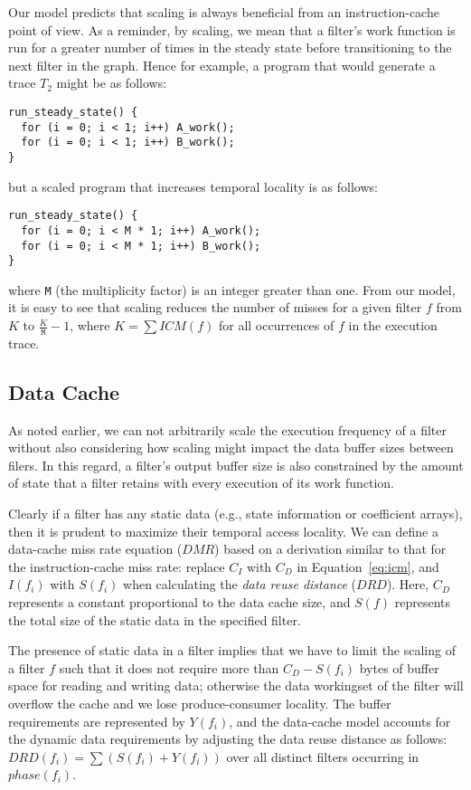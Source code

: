 Our model predicts that scaling is always beneficial from an
instruction-cache point of view. As a reminder, by scaling, we mean
that a filter's work function is run for a greater number of times in
the steady state before transitioning to the next filter in the
graph. Hence for example, a program that would generate a trace $T_2$
might be as follows:
\begin{verbatim}
run_steady_state() {
  for (i = 0; i < 1; i++) A_work();
  for (i = 0; i < 1; i++) B_work();
}
\end{verbatim}
but a scaled program that increases temporal locality is as follows:
\begin{verbatim}
run_steady_state() {
  for (i = 0; i < M * 1; i++) A_work();
  for (i = 0; i < M * 1; i++) B_work();
}
\end{verbatim}
where \texttt{M} (the multiplicity factor) is an integer greater than
one. From our model, it is easy to see that scaling reduces the number
of misses for a given filter $f$ from $K$ to $\frac{K}{\texttt{M}}- 1$, where $K =
\sum ICM(f)$ for all occurrences of $f$ in  the execution trace.

\subsection{Data Cache}

As noted earlier, we can not arbitrarily scale the execution frequency
of a filter without also considering how scaling might impact
the data buffer sizes between filers. In this regard, a filter's
output buffer size is also constrained by the amount of state that a
filter retains with every execution of its work function.

Clearly if a filter has any static data (e.g., state information or
coefficient arrays), then it is prudent to maximize their temporal
access locality. We can define a data-cache miss rate equation ($DMR$) based on
a derivation similar to that for the instruction-cache miss rate:
replace $C_I$ with $C_D$ in Equation~\ref{eq:icm}, and $I(f_i)$ with
$S(f_i)$ when calculating the {\it data reuse distance} ($DRD$). 
Here, $C_D$ represents a constant proportional to the data cache size,
and $S(f)$ represents the total size of the static data in the
specified filter.

The presence of static data in a filter implies that we have to limit
the scaling of a filter $f$ such that it does not require more than $C_D -
S(f_i)$ bytes of buffer space for reading and writing data; otherwise
the data workingset of the filter will overflow the cache and we lose
produce-consumer locality. The buffer requirements are represented by
$Y(f_i)$, and the data-cache model accounts for the dynamic data
requirements by adjusting the data reuse distance as follows:
$DRD(f_i) = \sum (S(f_i) + Y(f_i))$ over all distinct filters occurring
in $phase(f_i)$.

